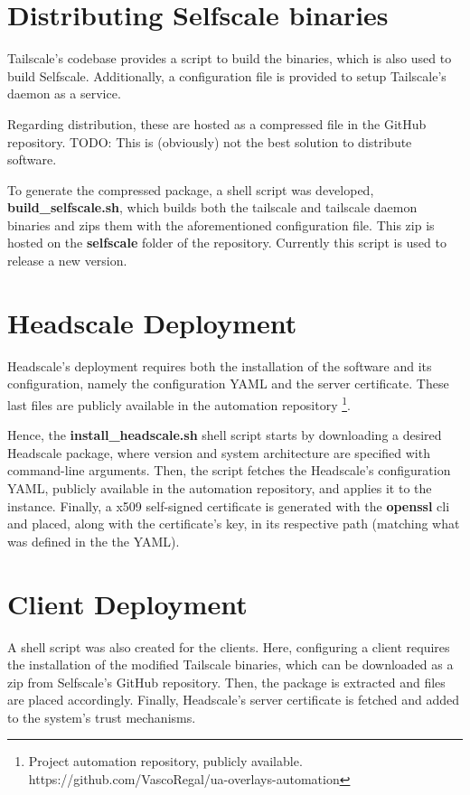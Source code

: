 \documentclass[11pt,twoside,a4paper]{report}
\begin{document}
\section{Distributing Selfscale binaries}

Tailscale's codebase provides a script to build the binaries, which is also used to build Selfscale. Additionally, a configuration file is provided to setup Tailscale's daemon as a service.

Regarding distribution, these are hosted as a compressed file in the GitHub repository. TODO: This is (obviously) not the best solution to distribute software.

To generate the compressed package, a shell script was developed, \textbf{build\_selfscale.sh}, which builds both the tailscale and tailscale daemon binaries and zips them with the aforementioned configuration file. This zip is hosted on the \textbf{selfscale} folder of the repository. Currently this script is used to release a new version.

\section{Headscale Deployment}

Headscale's deployment requires both the installation of the software and its configuration, namely the configuration YAML and the server certificate. These last files are publicly available in the automation repository \footnote{Project automation repository, publicly available. https://github.com/VascoRegal/ua-overlays-automation}.

Hence, the \textbf{install\_headscale.sh} shell script starts by downloading a desired Headscale package, where version and system architecture are specified with command-line arguments. Then, the script fetches the Headscale's configuration YAML, publicly available in the automation repository, and applies it to the instance. Finally, a x509 self-signed certificate is generated with the \textbf{openssl} \ac{cli} and placed, along with the certificate's key, in its respective path (matching what was defined in the the YAML).

\section{Client Deployment}

A shell script was also created for the clients. Here, configuring a client requires the installation of the modified Tailscale binaries, which can be downloaded as a zip from Selfscale's GitHub repository. Then, the package is extracted and files are placed accordingly. Finally, Headscale's server certificate is fetched and added to the system's trust mechanisms.
\end{document}
